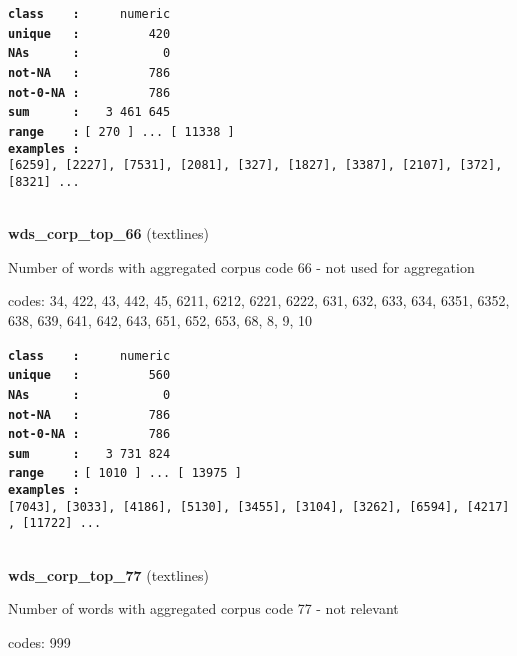 \documentclass[]{article}
\begin{document}
\textbf{\texttt{class\ \ \ \ :}} \texttt{~~~~~numeric}\\
\textbf{\texttt{unique\ \ \ :}} \texttt{~~~~~~~~~420}\\
\textbf{\texttt{NAs\ \ \ \ \ \ :}} \texttt{~~~~~~~~~~~0}\\
\textbf{\texttt{not-NA\ \ \ :}} \texttt{~~~~~~~~~786}\\
\textbf{\texttt{not-0-NA\ :}} \texttt{~~~~~~~~~786}\\
\textbf{\texttt{sum\ \ \ \ \ \ :}} \texttt{~~~3~461~645}\\
\textbf{\texttt{range\ \ \ \ :}}
\texttt{{[}\ 270\ {]}\ ...\ {[}\ 11338\ {]}}\\
\textbf{\texttt{examples\ :}}
\texttt{{[}6259{]},\ {[}2227{]},\ {[}7531{]},\ {[}2081{]},\ {[}327{]},\ {[}1827{]},\ {[}3387{]},\ {[}2107{]},\ {[}372{]},\ {[}8321{]}\ ...}\\

~

\textbf{wds\_corp\_top\_66} (textlines)

Number of words with aggregated corpus code 66 - not used for
aggregation

codes: 34, 422, 43, 442, 45, 6211, 6212, 6221, 6222, 631, 632, 633, 634,
6351, 6352, 638, 639, 641, 642, 643, 651, 652, 653, 68, 8, 9, 10

\textbf{\texttt{class\ \ \ \ :}} \texttt{~~~~~numeric}\\
\textbf{\texttt{unique\ \ \ :}} \texttt{~~~~~~~~~560}\\
\textbf{\texttt{NAs\ \ \ \ \ \ :}} \texttt{~~~~~~~~~~~0}\\
\textbf{\texttt{not-NA\ \ \ :}} \texttt{~~~~~~~~~786}\\
\textbf{\texttt{not-0-NA\ :}} \texttt{~~~~~~~~~786}\\
\textbf{\texttt{sum\ \ \ \ \ \ :}} \texttt{~~~3~731~824}\\
\textbf{\texttt{range\ \ \ \ :}}
\texttt{{[}\ 1010\ {]}\ ...\ {[}\ 13975\ {]}}\\
\textbf{\texttt{examples\ :}}
\texttt{{[}7043{]},\ {[}3033{]},\ {[}4186{]},\ {[}5130{]},\ {[}3455{]},\ {[}3104{]},\ {[}3262{]},\ {[}6594{]},\ {[}4217{]},\ {[}11722{]}\ ...}\\

~

\textbf{wds\_corp\_top\_77} (textlines)

Number of words with aggregated corpus code 77 - not relevant

codes: 999
\end{document}
